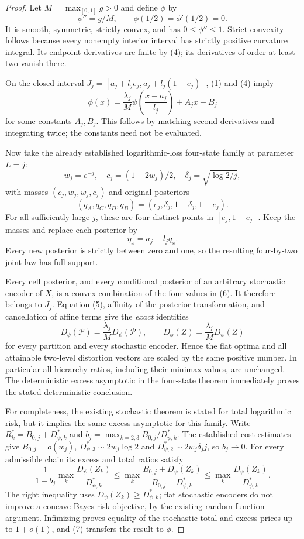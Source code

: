 \begin{proof}
Let $M=\max_{[0,1]}g>0$ and define $\phi$ by
\[
 \phi''=g/M,\qquad \phi(1/2)=\phi'(1/2)=0.
 \tag{4}\label{eq:integrate-curvature}
\]
It is smooth, symmetric, strictly convex, and has $0\leq\phi''\leq1$.
Strict convexity follows because every nonempty interior interval has
strictly positive curvature integral.  Its endpoint derivatives are
finite by (4); its derivatives of order at least two vanish there.

On the closed interval
$J_j=[a_j+l_je_j,a_j+l_j(1-e_j)]$, (1) and (4) imply
\[
 \phi(x)=\frac{\lambda_j}{M}
          \psi\left(\frac{x-a_j}{l_j}\right)+A_jx+B_j
 \tag{5}\label{eq:exact-local-copy}
\]
for some constants $A_j,B_j$.  This follows by matching second
derivatives and integrating twice; the constants need not be evaluated.

Now take the already established logarithmic-loss four-state family
at parameter $L=j$:
\[
 w_j=e^{-j},\quad c_j=(1-2w_j)/2,\quad
 \delta_j=\sqrt{\log2/j},
\]
with masses $(c_j,w_j,w_j,c_j)$ and original posteriors
\[
 (q_A,q_C,q_D,q_B)=(e_j,\delta_j,1-\delta_j,1-e_j).
\]
For all sufficiently large $j$, these are four distinct points in
$[e_j,1-e_j]$.  Keep the masses and replace each posterior by
\[
 \eta_x=a_j+l_jq_x.
 \tag{6}\label{eq:transformed-posteriors}
\]
Every new posterior is strictly between zero and one, so the resulting
four-by-two joint law has full support.

Every cell posterior, and every conditional posterior of an arbitrary
stochastic encoder of $X$, is a convex combination of the four values
in (6).  It therefore belongs to $J_j$.  Equation (5), affinity of the
posterior transformation, and cancellation of affine terms give the
\emph{exact} identities
\[
 D_\phi(\mathcal P)=\frac{\lambda_j}{M}D_\psi(\mathcal P),\qquad
 D_\phi(Z)=\frac{\lambda_j}{M}D_\psi(Z)
 \tag{7}\label{eq:all-encoder-transfer}
\]
for every partition and every stochastic encoder.  Hence the flat
optima and all attainable two-level distortion vectors are scaled by
the same positive number.  In particular all hierarchy ratios, including
their minimax values, are unchanged.  The deterministic excess
asymptotic in the four-state theorem immediately proves the stated
deterministic conclusion.

For completeness, the existing stochastic theorem is stated for total
logarithmic risk, but it implies the same excess asymptotic for this
family.  Write $R_k^*=B_{0,j}+D_{\psi,k}^*$ and
$b_j=\max_{k=2,3}B_{0,j}/D_{\psi,k}^*$.  The established cost estimates
give $B_{0,j}=o(w_j)$, $D_{\psi,3}^*\sim2w_j\log2$ and
$D_{\psi,2}^*\sim2w_j\delta_jj$, so $b_j\to0$.  For every admissible
chain its excess and total ratios satisfy
\[
 \frac1{1+b_j}\max_k\frac{D_\psi(Z_k)}{D_{\psi,k}^*}
 \leq\max_k\frac{B_{0,j}+D_\psi(Z_k)}{B_{0,j}+D_{\psi,k}^*}
 \leq\max_k\frac{D_\psi(Z_k)}{D_{\psi,k}^*}.
\]
The right inequality uses $D_\psi(Z_k)\geq D_{\psi,k}^*$; flat
stochastic encoders do not improve a concave Bayes-risk objective,
by the existing random-function argument.  Infimizing proves equality
of the stochastic total and excess prices up to $1+o(1)$, and (7)
transfers the result to $\phi$.


\end{proof}
